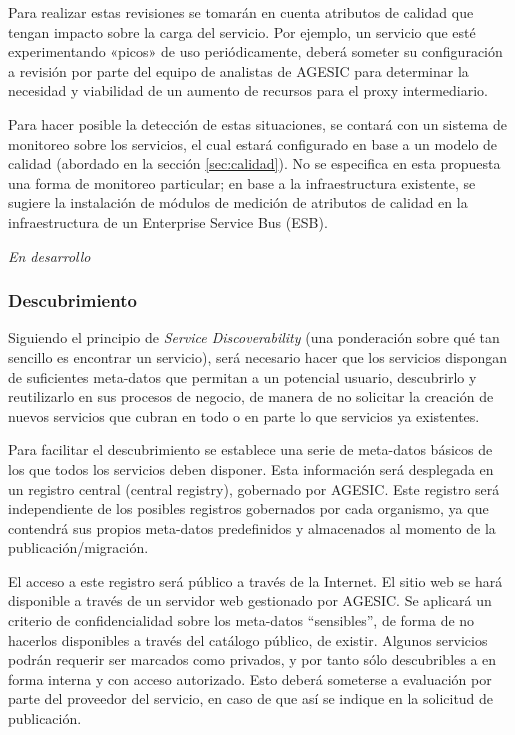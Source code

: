 \documentclass[11pt]{article}
\begin{document}
				Para realizar estas revisiones se tomarán en cuenta atributos de calidad que tengan impacto sobre la carga del servicio. Por ejemplo, un servicio que esté experimentando «picos» de uso periódicamente, deberá someter su configuración a revisión por parte del equipo de analistas de AGESIC para determinar la necesidad y viabilidad de un aumento de recursos para el proxy intermediario.

				Para hacer posible la detección de estas situaciones, se contará con un sistema de monitoreo sobre los servicios, el cual estará configurado en base a un modelo de calidad (abordado en la sección \ref{sec:calidad}). No se especifica en esta propuesta una forma de monitoreo particular; en base a la infraestructura existente, se sugiere la instalación de módulos de medición de atributos de calidad en la infraestructura de un Enterprise Service Bus (ESB).

				\emph{En desarrollo}

			\subsubsection{Descubrimiento}
				Siguiendo el principio de \emph{Service Discoverability} (una ponderación sobre qué tan sencillo es encontrar un servicio), será necesario hacer que los servicios dispongan de suficientes meta-datos que permitan a un potencial usuario, descubrirlo y reutilizarlo en sus procesos de negocio, de manera de no solicitar la creación de nuevos servicios que cubran en todo o en parte lo que servicios ya existentes.

				Para facilitar el descubrimiento se establece una serie de meta-datos básicos de los que todos los servicios deben disponer. Esta información será desplegada en un registro central (central registry), gobernado por AGESIC. Este registro será independiente de los posibles registros gobernados por cada organismo, ya que contendrá sus propios meta-datos predefinidos y almacenados al momento de la publicación/migración.

				El acceso a este registro será público a través de la Internet. El sitio web se hará disponible a través de un servidor web gestionado por AGESIC. Se aplicará un criterio de confidencialidad sobre los meta-datos “sensibles”, de forma de no hacerlos disponibles a través del catálogo público, de existir.
				Algunos servicios podrán requerir ser marcados como privados, y por tanto sólo descubribles a en forma interna y con acceso autorizado. Esto deberá someterse a evaluación por parte del proveedor del servicio, en caso de que así se indique en la solicitud de publicación.
\end{document}
